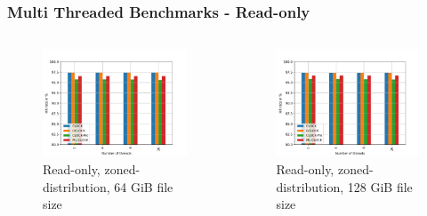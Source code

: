 \documentclass[
	aspectratio=169,
	compress,
]{beamer}
\newcommand{\navframetitle}[1]{\frametitle{#1\hfill{\footnotesize\lastsection{}}}}
\begin{document}
\begin{frame}[fragile]
	\navframetitle{Multi Threaded Benchmarks - Read-only}

	\begin{columns}
		\begin{column}{0.5\textwidth}
			\begin{figure}[ht]
    			\centering
    			\includegraphics[width=\textwidth]{multi_64_gb_randread_zoned.jpg}
        		\caption{Read-only, zoned-distribution, 64 GiB file size}
			\end{figure}
		\end{column}
		\begin{column}{0.5\textwidth}
			\begin{figure}[ht]
    			\centering
    			\includegraphics[width=\textwidth]{multi_128_gb_randread_zoned.jpg}
        		\caption{Read-only, zoned-distribution, 128 GiB file size}
			\end{figure}			
		\end{column}
	\end{columns}
\end{frame}
\end{document}
